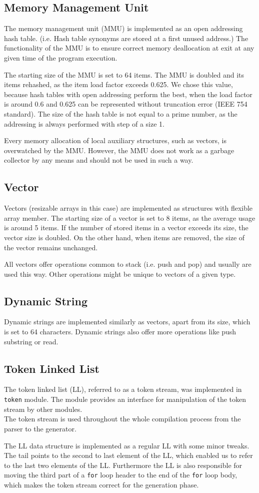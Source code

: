\documentclass[12pt]{article}
\begin{document}
\subsection{Memory Management Unit}
The memory management unit (MMU) is implemented as an open addressing hash table. (i.e. Hash table synonyms are stored at a first unused address.) The functionality of the MMU is to ensure correct memory deallocation at exit at any given time of the program execution. \par
The starting size of the MMU is set to 64 items. The MMU is doubled and its items rehashed, as the item load factor exceeds 0.625. We chose this value, because hash tables with open addressing perform the best, when the load factor is around 0.6 and 0.625 can be represented without truncation error (IEEE 754 standard). The size of the hash table is not equal to a prime number, as the addressing is always performed with step of a size 1.\par
Every memory allocation of local auxiliary structures, such as vectors, is overwatched by the MMU. However, the MMU does not work as a garbage collector by any means and should not be used in such a way.
\subsection{Vector}
Vectors (resizable arrays in this case) are implemented as structures with flexible array member. The starting size of a vector is set to 8 items, as the average usage is around 5 items. If the number of stored items in a vector exceeds its size, the vector size is doubled. On the other hand, when items are removed, the size of the vector remains unchanged.\par
All vectors offer operations common to stack (i.e. push and pop) and usually are used this way. Other operations might be unique to vectors of a given type.
\subsection{Dynamic String}
Dynamic strings are implemented similarly as vectors, apart from its size, which is set to 64 characters. Dynamic strings also offer more operations like push substring or read.
\subsection{Token Linked List}
The token linked list (LL), referred to as a token stream, was implemented in \texttt{token} module. The module provides an interface for manipulation of the token stream by other modules.\\The token stream is used throughout the whole compilation process from the parser to the generator. \par
The LL data structure is implemented as a regular LL with some minor tweaks. The tail points to the second to last element of the LL, which enabled us to refer to the last two elements of the LL. Furthermore the LL is also responsible for moving the third part of a \texttt{for} loop header to the end of the \texttt{for} loop body, which makes the token stream correct for the generation phase.
\end{document}
